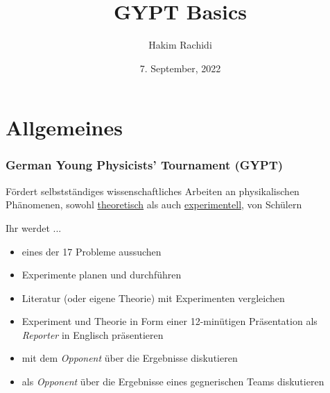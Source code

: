 \documentclass[9pt]{beamer}
\author{Hakim Rachidi}
\title{GYPT Basics}
\date{7. September, 2022}
\begin{document}
\begin{frame}
\titlepage
\end{frame}

\section{Allgemeines}

\begin{frame}
\frametitle{German Young Physicists' Tournament (GYPT)}


\begin{center}
{\large Fördert \color{orange} selbstständiges \color{blue}wissenschaftliches \color{black} Arbeiten an physikalischen Phänomenen, sowohl \underline{theoretisch} als auch \underline{experimentell}, von Schülern}
\end{center}
\pause
\vfill

Ihr werdet ...
\begin{itemize}
\item eines der 17 Probleme aussuchen
\item Experimente planen und durchführen
\item Literatur (oder eigene Theorie) mit Experimenten vergleichen
\item Experiment und Theorie in Form einer 12-minütigen Präsentation als \emph{Reporter} in Englisch präsentieren
\item mit dem \emph{Opponent} über die Ergebnisse diskutieren
\item als \emph{Opponent} über die Ergebnisse eines gegnerischen Teams diskutieren
\end{itemize}
\end{frame}
\end{document}
